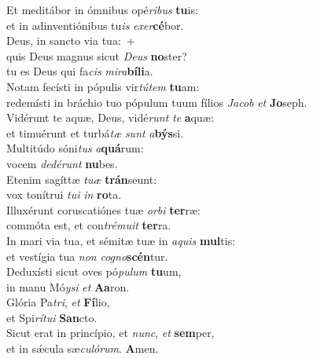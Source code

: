\evenverse Et meditábor in ómnibus opé\textit{ri}\textit{bus} \textbf{tu}is:~\*\\
\evenverse et in adinventiónibus tu\textit{is} \textit{e}\textit{xer}\textbf{cé}bor.\\
\oddverse Deus, in sancto via tua:~+\\
\oddverse  quis Deus magnus sicut \textit{De}\textit{us} \textbf{no}ster?~\*\\
\oddverse tu es Deus qui fa\textit{cis} \textit{mi}\textit{ra}\textbf{bí}\textbf{li}a.\\
\evenverse Notam fecísti in pópulis vir\textit{tú}\textit{tem} \textbf{tu}am:~\*\\
\evenverse redemísti in bráchio tuo pópulum tuum fílios \textit{Ja}\textit{cob} \textit{et} \textbf{Jo}seph.\\
\oddverse Vidérunt te aquæ, Deus, vidé\textit{runt} \textit{te} \textbf{a}quæ:~\*\\
\oddverse et timuérunt et turbá\textit{tæ} \textit{sunt} \textit{a}\textbf{býs}si.\\
\evenverse Multitúdo sóni\textit{tus} \textit{a}\textbf{quá}rum:~\*\\
\evenverse vocem \textit{de}\textit{dé}\textit{runt} \textbf{nu}bes.\\
\oddverse Etenim sagíttæ \textit{tu}\textit{æ} \textbf{trán}seunt:~\*\\
\oddverse vox tonítrui \textit{tu}\textit{i} \textit{in} \textbf{ro}ta.\\
\evenverse Illuxérunt coruscatiónes tuæ \textit{or}\textit{bi} \textbf{ter}ræ:~\*\\
\evenverse commóta est, et con\textit{tré}\textit{mu}\textit{it} \textbf{ter}ra.\\
\oddverse In mari via tua, et sémitæ tuæ in \textit{a}\textit{quis} \textbf{mul}tis:~\*\\
\oddverse et vestígia tua \textit{non} \textit{co}\textit{gno}\textbf{scén}tur.\\
\evenverse Deduxísti sicut oves pó\textit{pu}\textit{lum} \textbf{tu}um,~\*\\
\evenverse in manu Mó\textit{y}\textit{si} \textit{et} \textbf{A}\textbf{a}ron.\\
\oddverse Glória Pa\textit{tri}, \textit{et} \textbf{Fí}lio,~\*\\
\oddverse et Spi\textit{rí}\textit{tu}\textit{i} \textbf{San}cto.\\
\evenverse Sicut erat in princípio, et \textit{nunc}, \textit{et} \textbf{sem}per,~\*\\
\evenverse et in sǽcula sæ\textit{cu}\textit{ló}\textit{rum}. \textbf{A}men.\\
